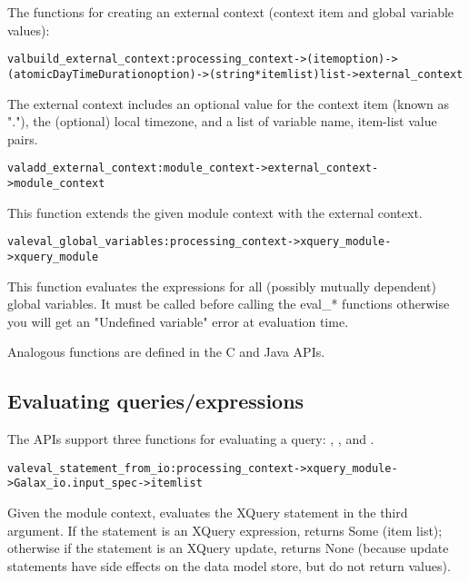    The functions for creating an external context (context item and
   global variable values):

\begin{alltt}
val build\_external\_context : processing\_context -> (item option) ->
  (atomicDayTimeDuration option) -> (string * item list) list ->  external\_context
\end{alltt}

     The external context includes an optional value for the context
     item (known as "."), the (optional) local timezone, and a list of
     variable name, item-list value pairs.

\begin{alltt}
val add\_external\_context : module\_context -> external\_context -> module\_context
\end{alltt}
This function extends the given module context with the external context.

\begin{alltt}
val eval\_global\_variables : processing\_context -> xquery\_module -> xquery\_module 
\end{alltt}
      This function evaluates the expressions for all (possibly
      mutually dependent) global variables.  It must be called before
      calling the eval\_* functions otherwise you will get an
      "Undefined variable" error at evaluation time.

   Analogous functions are defined in the C and Java APIs.
\subsection{Evaluating queries/expressions}

  The APIs support three functions for evaluating a query:
  , , and .


\begin{alltt}
val eval\_statement\_from\_io : processing\_context -> xquery\_module -> Galax\_io.input\_spec -> item list
\end{alltt}
       Given the module context, evaluates the XQuery statement  in
       the third argument.  If the statement is an XQuery expression,
       returns Some (item list); otherwise if the statement is an
       XQuery update, returns None (because update statements have
       side effects on the data model store, but do not return values).

